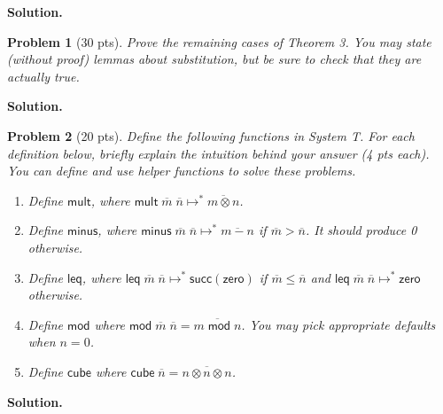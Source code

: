 \documentclass{article}
\newcommand{\m}[1]{\mathsf{#1}}
\newcommand{\step}{\mapsto}
\newcommand{\num}[1]{\overline{#1}}
\newcommand{\mstep}{\step^{*}}
\newcommand{\zero}{\m{zero}}
\renewcommand{\succ}[1]{\m{succ}(#1)}
\newtheorem{problem}{Problem}
\newenvironment{solution}{\textbf{Solution.}}{}
\begin{document}
\begin{solution}
  
\end{solution}


\begin{problem}[30 pts]
  Prove the remaining cases of Theorem 3.
  You may state (without proof) lemmas about substitution, but be sure
  to check that they are actually true.
\end{problem}

\begin{solution}
  
\end{solution}


\begin{problem}[20 pts]
    Define the following functions in System T. For each definition below,
    briefly explain the intuition behind your answer (4 pts each).
    You can define and use helper functions to solve these problems.

    \begin{enumerate}
        \item Define $\m{mult}$, where $\m{mult} \; \num{m} \; \num{n} \mstep \num{m \otimes n}$.
        \item Define $\m{minus}$, where $\m{minus} \; \num{m} \; \num{n} \mstep \num{m - n}$ if $\num{m} > \num{n}$. It should produce 0 otherwise.
        \item Define $\m{leq}$, where $\m{leq} \; \num{m} \; \num{n} \mstep \succ{\zero}$ if $\num{m} \leq \num{n}$ and
        $\m{leq} \; \num{m} \; \num{n} \mstep \zero$ otherwise.
        \item Define $\m{mod}$ where $\m{mod} \; \num{m} \; \num{n} = \num{m \; \m{mod} \; n}$. You may pick appropriate defaults when $n = 0$.
        \item Define $\m{cube}$ where $\m{cube} \; \num{n} = \num{n \otimes n \otimes n}$.
    \end{enumerate}

\end{problem}

\begin{solution}
  
\end{solution}
\end{document}
